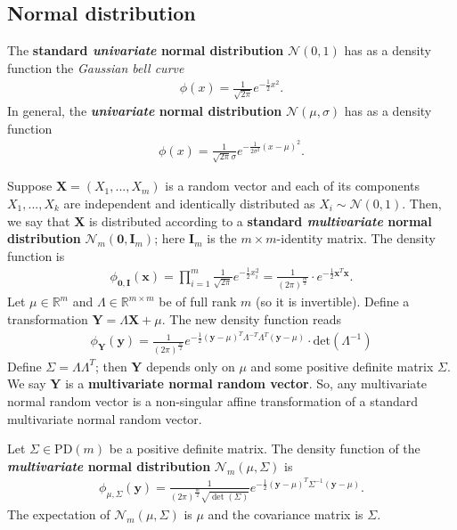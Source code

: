 \subsection{Normal distribution}

\begin{mdframed}
The \textbf{standard \emph{univariate} normal distribution} \( \mathcal{N}(0,1) \) has as a density function the \emph{Gaussian bell curve}
\begin{align*}
  \phi(x) = \frac{1}{\sqrt{2\pi}} e^{-\frac{1}{2}x^2}.
\end{align*}
In general, the \textbf{\emph{univariate} normal distribution} \( \mathcal{N}(\mu,\sigma) \) has as a density function
\begin{align*}
  \phi(x) = \frac{1}{\sqrt{2\pi} \sigma} e^{-\frac{1}{2\sigma^2}(x - \mu)^2}.
\end{align*}
\end{mdframed}

Suppose \( \mathbf X = (X_1,...,X_m) \) is a random vector and each of its components \( X_1,...,X_k \) are independent and identically distributed as \( X_i \sim \mathcal{N}(0,1) \). Then, we say that \( \mathbf X \) is distributed according to a \textbf{standard \emph{multivariate} normal distribution} \( \mathcal{N}_m(\mathbf 0, \mathbf I_m) \); here \( \mathbf I_m \) is the \( m \times m \)-identity matrix. The density function is 
\begin{align*}
  \phi_{\mathbf 0, \mathbf I}(\mathbf x) 
  = \prod^m_{i=1} \frac{1}{\sqrt{2 \pi}}e^{-\frac{1}{2}x_i^2}  
  = \frac{1}{(2 \pi)^{\frac{m}{2}}} \cdot e^{-\frac{1}{2} \mathbf x^T \mathbf x}.
\end{align*}
Let \( \mu \in \mathbb R^m \) and \( \Lambda \in \mathbb R^{m \times m} \) be of full rank \( m \) (so it is invertible). Define a transformation \( \mathbf Y = \Lambda \mathbf X + \mu \). The new density function reads
\begin{align*}
  \phi_{\mathbf Y}(\mathbf y) = \frac{1}{(2 \pi)^{\frac{m}{2}}} e^{-\frac{1}{2}(\mathbf y - \mu)^T\Lambda^{-T}\Lambda^T(\mathbf y - \mu)} \cdot  \mathrm{det}(\Lambda^{-1})
\end{align*}
Define \( \Sigma = \Lambda \Lambda^T \); then \( \mathbf Y \) depends only on \( \mu \) and some positive definite matrix \( \Sigma \). We say \( \mathbf Y \) is a \textbf{multivariate normal random vector}. So, any multivariate normal random vector is a non-singular affine transformation of a standard multivariate normal random vector.
\begin{mdframed}
Let \( \Sigma \in \mathrm{PD}(m) \) be a positive definite matrix. The density function of the \textbf{\emph{multivariate} normal distribution} \( \mathcal{N}_m(\mu,\Sigma) \) is
\begin{align*}
  \phi_{\mu, \Sigma}(\mathbf y) = \frac{1}{(2 \pi)^{\frac{m}{2}} \sqrt{\det(\Sigma)}}e^{-\frac{1}{2}(\mathbf y - \mu)^T\Sigma^{-1}(\mathbf y- \mu)}.
\end{align*}
The expectation of \( \mathcal{N}_m(\mu, \Sigma) \) is \( \mu \) and the covariance matrix is \( \Sigma \).
\end{mdframed}


